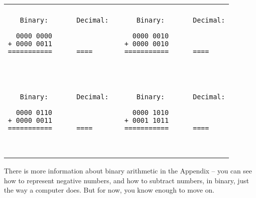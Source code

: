 \begin{tabular}{p{3in} | c  p{3in} }
\hline
\\
\begin{minipage}{2.95in}
\begin{verbatim}
   Binary:       Decimal:

  0000 0000
+ 0000 0011
===========      ====

___________      ____
\end{verbatim}
\end{minipage}

&&

\begin{minipage}{2.95in}
\begin{verbatim}
   Binary:       Decimal:

  0000 0010
+ 0000 0010
===========      ====

___________      ____
\end{verbatim}
\end{minipage}

\\
\hline
\\

\begin{minipage}{2.95in}
\begin{verbatim}
   Binary:       Decimal:

  0000 0110
+ 0000 0011
===========      ====

___________      ____
\end{verbatim}
\end{minipage}

&&

\begin{minipage}{2.95in}
\begin{verbatim}
   Binary:       Decimal:

  0000 1010
+ 0001 1011
===========      ====

___________      ____
\end{verbatim}
\end{minipage}

\\
\hline
\end{tabular}

There is more information about binary arithmetic in the Appendix -- you can see how to represent negative numbers, and how to subtract numbers, in binary, just the way a computer does. But for now, you know enough to move on.

\vfill


